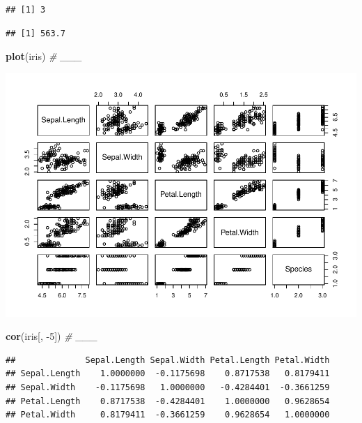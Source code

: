 \documentclass[]{article}
\newenvironment{Shaded}{\begin{snugshade}}{\end{snugshade}}
\newcommand{\CommentTok}[1]{\textcolor[rgb]{0.56,0.35,0.01}{\textit{#1}}}
\newcommand{\DecValTok}[1]{\textcolor[rgb]{0.00,0.00,0.81}{#1}}
\newcommand{\KeywordTok}[1]{\textcolor[rgb]{0.13,0.29,0.53}{\textbf{#1}}}
\newcommand{\NormalTok}[1]{#1}
\newcommand{\OperatorTok}[1]{\textcolor[rgb]{0.81,0.36,0.00}{\textbf{#1}}}
\begin{document}
\begin{verbatim}
## [1] 3
\end{verbatim}

\begin{Shaded}
\end{Shaded}

\begin{verbatim}
## [1] 563.7
\end{verbatim}

\begin{Shaded}
\begin{Highlighting}[]
\KeywordTok{plot}\NormalTok{(iris) }\CommentTok{# ___}
\end{Highlighting}
\end{Shaded}

\includegraphics{001_pendahuluan_files/figure-latex/unnamed-chunk-5-1.pdf}

\begin{Shaded}
\begin{Highlighting}[]
\KeywordTok{cor}\NormalTok{(iris[, }\DecValTok{-5}\NormalTok{]) }\CommentTok{# ___}
\end{Highlighting}
\end{Shaded}

\begin{verbatim}
##              Sepal.Length Sepal.Width Petal.Length Petal.Width
## Sepal.Length    1.0000000  -0.1175698    0.8717538   0.8179411
## Sepal.Width    -0.1175698   1.0000000   -0.4284401  -0.3661259
## Petal.Length    0.8717538  -0.4284401    1.0000000   0.9628654
## Petal.Width     0.8179411  -0.3661259    0.9628654   1.0000000
\end{verbatim}
\end{document}
